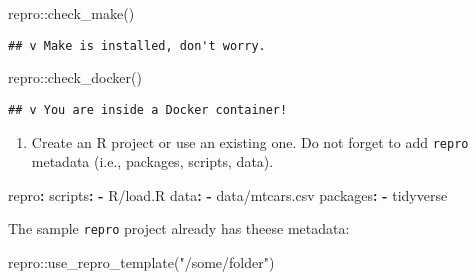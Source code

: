 \documentclass[psych,tutorial,accept,moreauthors,pdftex]{Definitions/mdpi}
\newenvironment{Shaded}{\begin{snugshade}}{\end{snugshade}}
\newcommand{\AttributeTok}[1]{\textcolor[rgb]{0.77,0.63,0.00}{#1}}
\newcommand{\FunctionTok}[1]{\textcolor[rgb]{0.00,0.00,0.00}{#1}}
\newcommand{\KeywordTok}[1]{\textcolor[rgb]{0.13,0.29,0.53}{\textbf{#1}}}
\newcommand{\NormalTok}[1]{#1}
\newcommand{\SpecialCharTok}[1]{\textcolor[rgb]{0.00,0.00,0.00}{#1}}
\newcommand{\StringTok}[1]{\textcolor[rgb]{0.31,0.60,0.02}{#1}}
\begin{document}
\begin{paracol}{2}
\begin{adjustwidth}{0.5cm}{0cm}
\begin{Shaded}
\begin{Highlighting}[]
\NormalTok{repro}\SpecialCharTok{::}\FunctionTok{check\_make}\NormalTok{()}
\end{Highlighting}
\end{Shaded}

\begin{verbatim}
## v Make is installed, don't worry.
\end{verbatim}

\begin{Shaded}
\begin{Highlighting}[]
\NormalTok{repro}\SpecialCharTok{::}\FunctionTok{check\_docker}\NormalTok{()}
\end{Highlighting}
\end{Shaded}

\begin{verbatim}
## v You are inside a Docker container!
\end{verbatim}
\end{adjustwidth}

\begin{enumerate}
\def\labelenumi{\arabic{enumi}.}
\setcounter{enumi}{2}
\item
  Create an R project or use an existing one. Do not forget to add
  \texttt{repro} metadata (i.e., packages, scripts, data).
\end{enumerate}


\begin{adjustwidth}{0.5cm}{0cm} 
\begin{Shaded}
\begin{Highlighting}[]
\FunctionTok{repro}\KeywordTok{:}
\AttributeTok{  }\FunctionTok{scripts}\KeywordTok{:}
\AttributeTok{    }\KeywordTok{{-}}\AttributeTok{ R/load.R}
\AttributeTok{  }\FunctionTok{data}\KeywordTok{:}
\AttributeTok{    }\KeywordTok{{-}}\AttributeTok{ data/mtcars.csv}
\AttributeTok{  }\FunctionTok{packages}\KeywordTok{:}
\AttributeTok{    }\KeywordTok{{-}}\AttributeTok{ tidyverse}
\end{Highlighting}
\end{Shaded}
\end{adjustwidth}

The sample \texttt{repro} project already has theese metadata:


\begin{adjustwidth}{0.5cm}{0cm} 
\begin{Shaded}
\begin{Highlighting}[]
\NormalTok{repro}\SpecialCharTok{::}\FunctionTok{use\_repro\_template}\NormalTok{(}\StringTok{"/some/folder"}\NormalTok{)}
\end{Highlighting}
\end{Shaded}
\end{adjustwidth}


\end{paracol}
\end{document}
